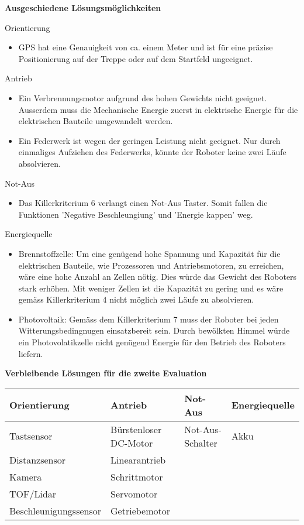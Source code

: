 \textbf{Ausgeschiedene Lösungsmöglichkeiten}

Orientierung
\begin{itemize}
    \item GPS hat eine Genauigkeit von ca. einem Meter und ist für eine präzise Positionierung auf der Treppe oder auf dem Startfeld ungeeignet.
\end{itemize}
Antrieb
\begin{itemize}
    \item Ein Verbrennungsmotor aufgrund des hohen Gewichts nicht geeignet. Ausserdem muss die Mechanische Energie zuerst in elektrische Energie für die elektrischen Bauteile umgewandelt werden.
    \item Ein Federwerk ist wegen der geringen Leistung nicht geeignet. Nur durch einmaliges Aufziehen des Federwerks, könnte der Roboter keine zwei Läufe absolvieren.
\end{itemize}
Not-Aus
\begin{itemize}
    \item Das Killerkriterium 6 verlangt einen Not-Aus Taster. Somit fallen die Funktionen 'Negative Beschleungiung' und 'Energie kappen' weg.
\end{itemize}
Energiequelle
\begin{itemize}
    \item Brennstoffzelle: Um eine genügend hohe Spannung und Kapazität für die elektrischen Bauteile, wie Prozessoren und Antriebsmotoren, zu erreichen, wäre eine hohe Anzahl an Zellen nötig. Dies würde das Gewicht des Roboters stark erhöhen. Mit weniger Zellen ist die Kapazität zu gering und es wäre gemäss Killerkriterium 4 nicht möglich zwei Läufe zu absolvieren.
    \item Photovoltaik: Gemäss dem Killerkriterium 7 muss der Roboter bei jeden Witterungsbedingnugen einsatzbereit sein. Durch bewölkten Himmel würde ein Photovolatikzelle nicht genügend Energie für den Betrieb des Roboters liefern.
\end{itemize}

\textbf{Verbleibende Lösungen für die zweite Evaluation}
\begin{center}
\begin{longtable}[h]{ l l l l}
 \textbf{Orientierung} & \textbf{Antrieb} & \textbf{Not-Aus} & \textbf{Energiequelle} \\ 
 \hline
 Tastsensor & Bürstenloser DC-Motor & Not-Aus-Schalter & Akku\\  
 Distanzsensor & Linearantrieb &  &\\
 Kamera & Schrittmotor & &\\
 TOF/Lidar & Servomotor & &\\
 Beschleunigungssensor & Getriebemotor & & 
\end{longtable}
\end{center}






